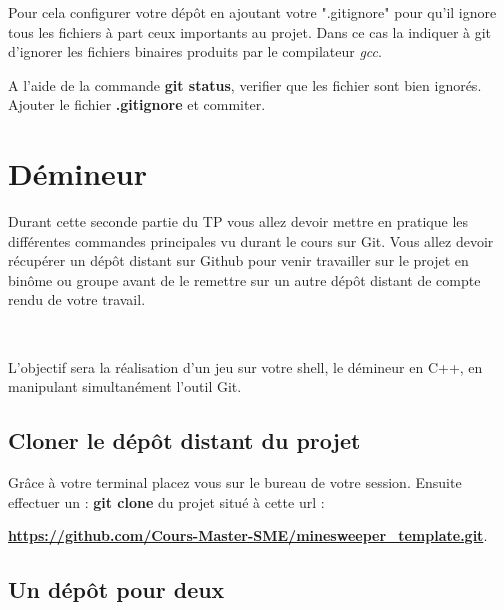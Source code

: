 Pour cela configurer votre dépôt en ajoutant votre ".gitignore" pour qu'il ignore tous les fichiers à part ceux importants au projet. Dans ce cas la indiquer à git d'ignorer les fichiers binaires produits par le compilateur \textit{gcc}.

\medskip

A l'aide de la commande \textbf{git status}, verifier que les fichier sont bien ignorés. Ajouter le fichier \textbf{.gitignore} et commiter.

\newpage 

\chapter{Démineur} 

Durant cette seconde partie du TP vous allez devoir mettre en pratique les différentes commandes principales vu durant le cours sur Git. Vous allez devoir récupérer un dépôt distant sur Github pour venir travailler sur le projet en binôme ou groupe avant de le remettre sur un autre dépôt distant de compte rendu de votre travail.

~

L'objectif sera la réalisation d'un jeu sur votre shell, le démineur en C++, en manipulant simultanément l'outil Git.

%
%
%
%
\section{Cloner le dépôt distant du projet}

Grâce à votre terminal placez vous sur le bureau de votre session. Ensuite effectuer un : \textbf{git clone} du projet situé à cette url : 

\begin{center}
    \textbf{\href{https://github.com/Cours-Master-SME/Minesweeper\_template.git}{https://github.com/Cours-Master-SME/minesweeper\_template.git}}.
\end{center}



\section{Un dépôt pour deux}

